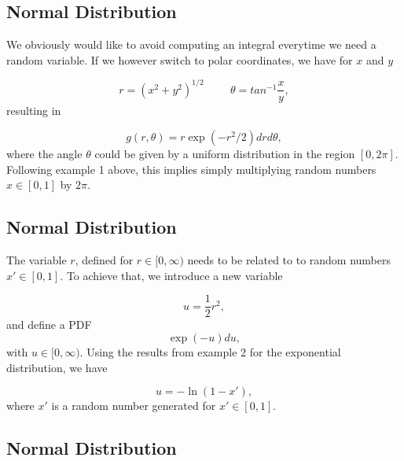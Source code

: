 \documentclass[%
oneside,                 %
final,                   %
10pt]{article}
\newenvironment{block_mdfboxadmon}[1][]{
\begin{block_mdfboxmdframed}[frametitle=#1]
}
{
\end{block_mdfboxmdframed}
}
\begin{document}
\subsection{Normal Distribution}

\begin{block_mdfboxadmon}[]
We obviously would like to avoid computing an integral everytime we need a random variable.
If we however switch to polar coordinates, we have
for $x$ and $y$

\begin{equation*}
   r=\left(x^2+y^2\right)^{1/2} \hspace{1cm}
   \theta =tan^{-1}\frac{x}{y},
\end{equation*}
resulting in

\begin{equation*}
  g(r,\theta)=r\exp{(-r^2/2)}drd\theta,
\end{equation*}
where the angle $\theta$ could be given by a uniform 
distribution in the region $[0,2\pi]$.
Following example 1 above, this implies simply 
multiplying random numbers 
$x\in [0,1]$ by $2\pi$.
\end{block_mdfboxadmon} %



\subsection{Normal Distribution}

\begin{block_mdfboxadmon}[]
The variable 
$r$, defined for $r \in [0,\infty)$ needs to be related to
to random numbers $x'\in [0,1]$. To achieve that, we introduce a new variable

\begin{equation*}
   u=\frac{1}{2}r^2,
\end{equation*}
and define a PDF
\begin{equation*}
  \exp{(-u)}du,
\end{equation*}
with $u\in [0,\infty)$. 
Using the results from example 2 for the exponential distribution, we have

\begin{equation*}
   u=-\ln{(1-x')},
\end{equation*}
where $x'$ is a random number generated for $x'\in [0,1]$.
\end{block_mdfboxadmon} %



\subsection{Normal Distribution}
\end{document}
